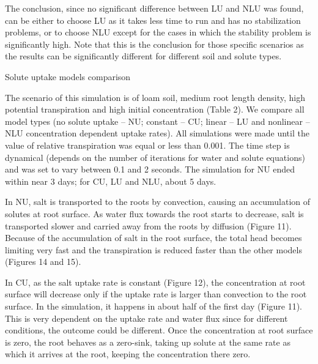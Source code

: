 
The conclusion, since no significant difference between LU and NLU was found, can be either to choose LU as it takes less time to run and has no stabilization problems, or to choose NLU except for the cases in which the stability problem is significantly high. Note that this is the conclusion for those specific scenarios as the results can be significantly different for different soil and solute types.


\sec Solute uptake models comparison

The scenario of this simulation is of loam soil, medium root length density, high potential transpiration and high initial concentration (Table 2). We compare all model types (no solute uptake -- NU; constant -- CU; linear -- LU and nonlinear -- NLU concentration dependent uptake rates). All simulations were made until the value of relative transpiration was equal or less than 0.001. The time step is dynamical (depends on the number of iterations for water and solute equations) and was set to vary between 0.1 and 2 seconds. The simulation for NU ended within near 3 days; for CU, LU and NLU, about 5 days.

In NU, salt is transported to the roots by convection, causing an accumulation of solutes at root surface. As water flux towards the root starts to decrease, salt is transported slower and carried away from the roots by diffusion (Figure 11). Because of the accumulation of salt in the root surface, the total head becomes limiting very fast and the transpiration is reduced faster than the other models (Figures 14 and 15).

In CU, as the salt uptake rate is constant (Figure 12), the concentration at root surface will decrease only if the uptake rate is larger than convection to the root surface. In the simulation, it happens in about half of the first day (Figure 11). This is very dependent on the uptake rate and water flux since for different conditions, the outcome could be different. Once the concentration at root surface is zero, the root behaves as a zero-sink, taking up solute at the same rate as which it arrives at the root, keeping the concentration there zero.

